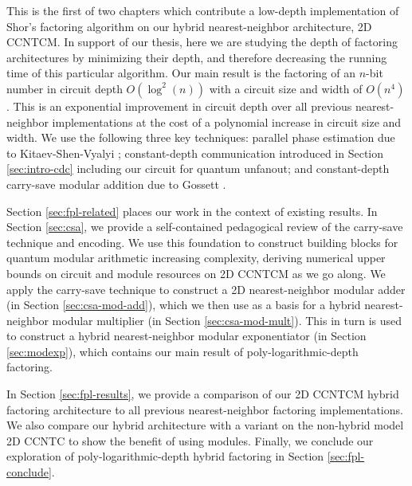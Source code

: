This is the first of two chapters which contribute a low-depth
implementation of Shor's factoring algorithm on our hybrid nearest-neighbor
architecture, \textsf{2D CCNTCM}. In support of our thesis,
here we are studying the depth of factoring architectures by minimizing
their depth, and therefore decreasing the running time of this
particular algorithm. Our main result is the
factoring of an
$n$-bit number in circuit depth $O(\log^2(n))$
with a circuit size and width of $O(n^4)$.
This is an exponential improvement in circuit depth
over all previous nearest-neighbor implementations
\cite{Beauregard2002,Kutin2006,VanMeter2006,VanMeter2005,VanMeterIL2005}
at the cost of a polynomial increase in circuit size and width.
We use the
following three key techniques:
parallel phase estimation due to Kitaev-Shen-Vyalyi \cite{Kitaev2002};
constant-depth communication introduced in Section \ref{sec:intro-cdc}
including our circuit for quantum unfanout;
and 
constant-depth carry-save modular addition due to Gossett \cite{Gossett1998}.

Section \ref{sec:fpl-related} places our work in the context of existing
results.
In Section \ref{sec:csa}, we provide a self-contained pedagogical review
of the carry-save technique and encoding.
We use this foundation to construct building blocks for quantum modular
arithmetic increasing complexity,
deriving numerical upper bounds on circuit and module resources
on \textsf{2D CCNTCM} as we go along.
We apply the carry-save technique to construct a 2D
nearest-neighbor modular adder (in Section \ref{sec:csa-mod-add}),
which we then use as a basis for a hybrid nearest-neighbor modular multiplier
(in Section \ref{sec:csa-mod-mult}). This in turn is used to
construct a hybrid nearest-neighbor modular exponentiator
(in Section \ref{sec:modexp}), which contains our
main result of poly-logarithmic-depth factoring.


In Section \ref{sec:fpl-results}, we provide a comparison of our \textsf{2D CCNTCM}
hybrid factoring architecture to all previous nearest-neighbor factoring
implementations. We also compare our hybrid architecture with a
variant on the non-hybrid model \textsf{2D CCNTC} to show the
benefit of using modules. Finally, we conclude our exploration
of poly-logarithmic-depth hybrid factoring in Section
\ref{sec:fpl-conclude}.